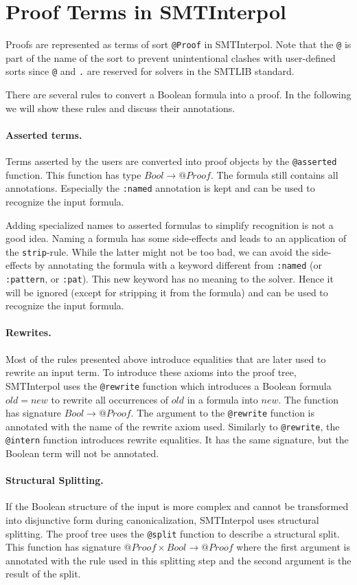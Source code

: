 \documentclass[a4paper]{article}
\newcommand\si{SMTInterpol\xspace}
\begin{document}
\section{Proof Terms in \si}
Proofs are represented as terms of sort \verb+@Proof+ in \si.  Note that the
\verb+@+ is part of the name of the sort to prevent unintentional clashes with
user-defined sorts since \verb+@+ and \verb+.+ are reserved for solvers in the
SMTLIB standard.

There are several rules to convert a Boolean formula into a proof.  In the
following we will show these rules and discuss their annotations.

\paragraph{Asserted terms.}  Terms asserted by the users are converted into
proof objects by the \verb+@asserted+ function.  This function has type
$Bool\rightarrow @Proof$.  The formula still contains all annotations.
Especially the \verb+:named+ annotation is kept and can be used to recognize
the input formula.

Adding specialized names to asserted formulas to simplify recognition is not a
good idea.  Naming a formula has some side-effects and leads to an application
of the \verb+strip+-rule.  While the latter might not be too bad, we can avoid
the side-effects by annotating the formula with a keyword different from
\verb+:named+ (or \verb+:pattern+, or \verb+:pat+).  This new keyword has no
meaning to the solver.  Hence it will be ignored (except for stripping it from
the formula) and can be used to recognize the input formula.

\paragraph{Rewrites.}  Most of the rules presented above introduce equalities
that are later used to rewrite an input term.  To introduce these axioms into
the proof tree, \si uses the \verb+@rewrite+ function which introduces a
Boolean formula $old = new$ to rewrite all occurrences of $old$ in a formula
into $new$.  The function has signature $Bool\rightarrow @Proof$.  The
argument to the \verb+@rewrite+ function is annotated with the name of the
rewrite axiom used.  Similarly to \verb+@rewrite+, the \verb+@intern+ function
introduces rewrite equalities.  It has the same signature, but the Boolean
term will not be annotated.

\paragraph{Structural Splitting.}  If the Boolean structure of the input is
more complex and cannot be transformed into disjunctive form during
canonicalization, \si uses structural splitting.  The proof tree uses the
\verb+@split+ function to describe a structural split.  This function has
signature $@Proof\times Bool\rightarrow @Proof$ where the first argument is
annotated with the rule used in this splitting step and the second argument is
the result of the split.
\end{document}
